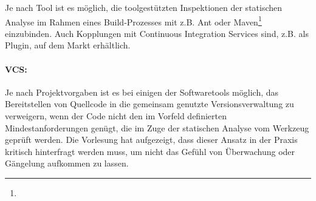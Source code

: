 Je nach Tool ist es möglich, die toolgestützten Inspektionen der statischen Analyse im Rahmen eines Build-Prozesses mit z.B. Ant oder Maven\footnote{} einzubinden. Auch Kopplungen mit Continuous Integration Services sind, z.B. als Plugin, auf dem Markt erhältlich.

\paragraph{VCS:} Je nach Projektvorgaben ist es bei einigen der Softwaretools möglich, das Bereitstellen von Quellcode in die gemeinsam genutzte Versionsverwaltung zu verweigern, wenn der Code nicht den im Vorfeld definierten Mindestanforderungen genügt, die im Zuge der statischen Analyse vom Werkzeug geprüft werden. Die Vorlesung hat aufgezeigt, dass dieser Ansatz in der Praxis kritisch hinterfragt werden muss, um nicht das Gefühl von Überwachung oder Gängelung aufkommen zu lassen.
